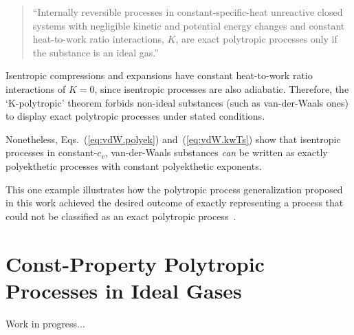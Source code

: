     \begin{quote}
        ``Internally reversible processes in constant-specific-heat  unreactive  closed  systems
        with negligible kinetic and potential energy changes  and  constant  heat-to-work  ratio
        interactions, $K$, are exact polytropic processes only if  the  substance  is  an  ideal
        gas.''
    \end{quote}

    Isentropic compressions and expansions have  constant  heat-to-work  ratio  interactions  of
    $K=0$, since isentropic processes are also adiabatic. Therefore, the `K-polytropic'  theorem
    forbids non-ideal substances (such  as  van-der-Waals  ones)  to  display  exact  polytropic
    processes under stated conditions.

    Nonetheless,  Eqs.~(\ref{eq:vdW.polyek})  and~(\ref{eq:vdW.kwTs})   show   that   isentropic
    processes in constant-$c_v$, van-der-Waals  substances  \emph{can}  be  written  as  exactly
    polyekthetic processes with constant polyekthetic exponents.

    This one example illustrates how the polytropic process generalization proposed in this work
    achieved the desired outcome of exactly representing a process that could not be  classified
    as an exact polytropic process~\cite{2020-NaaktgeborenC-engrXiv}.

    \section{Const-Property Polytropic Processes in Ideal Gases}

    Work in progress...


